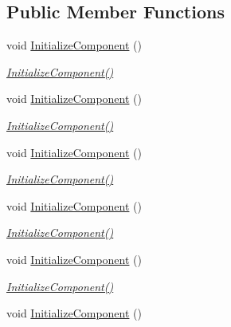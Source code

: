 \subsection*{Public Member Functions}
\begin{DoxyCompactItemize}
\item 
void \mbox{\hyperlink{class_r_f_storage_1_1_main_page_a44b868cd44ff5ee9dbe953b104a1f9a1}{Initialize\+Component}} ()
\begin{DoxyCompactList}\small\item\em \mbox{\hyperlink{class_r_f_storage_1_1_main_page_a44b868cd44ff5ee9dbe953b104a1f9a1}{Initialize\+Component()}} \end{DoxyCompactList}\item 
void \mbox{\hyperlink{class_r_f_storage_1_1_main_page_a44b868cd44ff5ee9dbe953b104a1f9a1}{Initialize\+Component}} ()
\begin{DoxyCompactList}\small\item\em \mbox{\hyperlink{class_r_f_storage_1_1_main_page_a44b868cd44ff5ee9dbe953b104a1f9a1}{Initialize\+Component()}} \end{DoxyCompactList}\item 
void \mbox{\hyperlink{class_r_f_storage_1_1_main_page_a44b868cd44ff5ee9dbe953b104a1f9a1}{Initialize\+Component}} ()
\begin{DoxyCompactList}\small\item\em \mbox{\hyperlink{class_r_f_storage_1_1_main_page_a44b868cd44ff5ee9dbe953b104a1f9a1}{Initialize\+Component()}} \end{DoxyCompactList}\item 
void \mbox{\hyperlink{class_r_f_storage_1_1_main_page_a44b868cd44ff5ee9dbe953b104a1f9a1}{Initialize\+Component}} ()
\begin{DoxyCompactList}\small\item\em \mbox{\hyperlink{class_r_f_storage_1_1_main_page_a44b868cd44ff5ee9dbe953b104a1f9a1}{Initialize\+Component()}} \end{DoxyCompactList}\item 
void \mbox{\hyperlink{class_r_f_storage_1_1_main_page_a44b868cd44ff5ee9dbe953b104a1f9a1}{Initialize\+Component}} ()
\begin{DoxyCompactList}\small\item\em \mbox{\hyperlink{class_r_f_storage_1_1_main_page_a44b868cd44ff5ee9dbe953b104a1f9a1}{Initialize\+Component()}} \end{DoxyCompactList}\item 
void \mbox{\hyperlink{class_r_f_storage_1_1_main_page_a44b868cd44ff5ee9dbe953b104a1f9a1}{Initialize\+Component}} ()

\end{DoxyCompactItemize}
